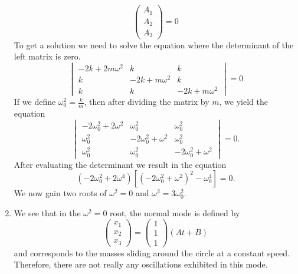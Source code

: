 \begin{sol}
\begin{enumerate}[label=\textbf{(\alph*)}]
\[\begin{pmatrix}
A_1 \\
A_2 \\
A_3
\end{pmatrix}
= 0
\]
To get a solution we need to solve the equation where the determinant of the left matrix is zero.
\[
\begin{vmatrix}
-2k + 2m \omega^{2} & k & k \\
k & -2k + m\omega^2 & k \\
k & k & -2k + m\omega^2
\end{vmatrix}
= 0
\]
If we define $\omega_0^2 = \frac{k}{m}$, then after dividing the matrix by $m$, we yield the equation 
\[
\begin{vmatrix}
-2\omega_0^2 + 2\omega^{2} & \omega_0^2 & \omega_0^2 \\
\omega_0^2 & -2\omega_0^2 + \omega^2 & \omega_0^2 \\
\omega_0^2 & \omega_0^2 & -2\omega_0^2 + \omega^2
\end{vmatrix}
= 0.
\]
After evaluating the determinant we result in the equation 
\[(-2\omega_0^2 + 2\omega^4)[(-2\omega_0^2 + \omega^2)^2 - \omega_0^4] = 0.\]
We now gain two roots of $\omega^2 = 0$ and $\omega^2 = 3\omega_0^2$.

\item We see that in the $\omega^2 = 0$ root, the normal mode is defined by 
\[
\begin{pmatrix}
x_1 \\
x_2 \\ 
x_3
\end{pmatrix}
= 
\begin{pmatrix}
1 \\
1 \\
1
\end{pmatrix}
(At + B)
\]
and corresponds to the masses sliding around the circle at a constant speed. Therefore, there are not really any oscillations exhibited in this mode. 
\end{enumerate}
\end{sol}